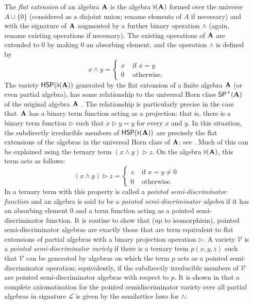 \documentclass[reqno]{amsart}
\theoremstyle{plain}
\theoremstyle{definition}
\newcommand{\tr}{\triangleright}
\begin{document}
The \emph{flat extension} of an algebra ${\bf A}$ is the algebra $\flat({\bf A})$ formed over the universe $A\cup\{0\}$ (considered as a disjoint union; rename elements of $A$ if necessary) and with the signature of ${\bf A}$ augmented by a further binary operation $\wedge$ (again, rename existing operations if necessary).  The existing operations of ${\bf A}$ are extended to $0$ by making $0$ an absorbing element, and the operation $\wedge$ is defined by 
\[
x\wedge y =\begin{cases} x&\mbox{ if }x=y\\
0&\mbox{ otherwise.}\end{cases}
\]
The variety $\mathsf{HSP}(\flat({\bf A}))$ generated by the flat extension of a finite algebra ${\bf A}$ (or even partial algebra), has some relationship to the universal Horn class $\mathsf{SP}^+({\bf A})$ of the original algebra ${\bf A}$ \cite{jac:flat,wil0}.  The relationship is particularly precise in the case that~${\bf A}$ has a binary term function acting as a projection: that is, there is a binary term function $\tr$ such that  $x\tr y=y$ for every $x$ and $y$.  In this situation, the subdirectly irreducible members of $\mathsf{HSP}(\flat({\bf A}))$ are precisely the flat extensions of the algebras in the universal Horn class of ${\bf A}$; see \cite[\S5]{jac:flat}.  Much of this can be explained using  the ternary term $(x\wedge y)\tr z$.  On the algebra $\flat({\bf A})$, this term acts as follows:
\[
(x\wedge y)\tr z=\begin{cases}
z &\mbox{ if }x=y\neq 0\\
0&\mbox{ otherwise}.
\end{cases}
\]
In \cite[\S5]{jac:flat} a ternary term with this property is called a \emph{pointed semi-discriminator function} and an algebra is said to be a \emph{pointed semi-discriminator algebra} if it has an absorbing element $0$ and a term function acting as a pointed semi-discriminator function.  It is routine to show that (up to isomorphism), pointed semi-discriminator algebras are exactly those that are term equivalent to flat extensions of partial algebras with a binary projection operation $\tr$.
A variety $\mathscr{V}$ is a \emph{pointed semi-discriminator variety} if there is a ternary term $p(x,y,z)$ such that $\mathscr{V}$  can be generated by algebras on which the term $p$ acts as a pointed semi-discriminator operation; equivalently, if the subdirectly irreducible members of $\mathscr{V}$  are pointed semi-discriminator algebras with respect to $p$.  It is shown in \cite[Theorem 5.8]{jac:flat} that a complete axiomatisation for the pointed semidiscriminator variety over all partial algebras in signature $\mathscr{L}$ is given by the semilattice laws for $\wedge$:
\end{document}
